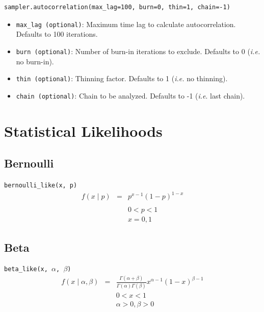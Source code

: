 \documentclass[]{book}
\begin{document}
\begin{verbatim}
sampler.autocorrelation(max_lag=100, burn=0, thin=1, chain=-1)
\end{verbatim}

\begin{itemize}

\item \verb=max_lag (optional)=: Maximum time lag to calculate autocorrelation. Defaults to 100 iterations.

\item \verb=burn (optional)=: Number of burn-in iterations to exclude. Defaults to 0 (\emph{i.e.} no burn-in).

\item \verb=thin (optional)=: Thinning factor. Defaults to 1 (\emph{i.e.} no thinning).

\item \verb=chain (optional)=: Chain to be analyzed. Defaults to -1 (\emph{i.e}. last chain).
\end{itemize}




\appendix

\chapter{Statistical Likelihoods}\label{chap:statistical_likelihoods}


\section*{Bernoulli}
\verb=bernoulli_like(x, p)=
\begin{eqnarray*}
f(x \mid p) &=& p^{x- 1} (1-p)^{1-x} \\
\\
&&0 < p < 1 \\
&&x=0,1
\end{eqnarray*}

\section*{Beta}
\verb=beta_like(x, =$\alpha$\verb=, =$\beta$\verb=)=
\begin{eqnarray*}
f(x \mid \alpha, \beta) &=& \frac{\Gamma(\alpha + \beta)}{\Gamma(\alpha) \Gamma(\beta)} x^{\alpha - 1} (1 - x)^{\beta - 1} \\
&&0 < x < 1 \\
&&\alpha > 0, \beta > 0
\end{eqnarray*}
\end{document}
